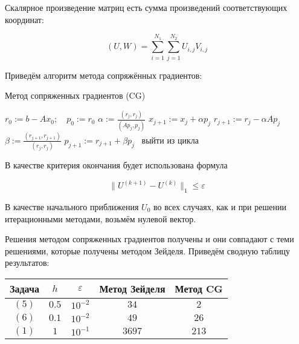 \documentclass[a4paper, 12pt]{article} %
\begin{document}
Скалярное произведение матриц есть сумма произведений соответствующих координат:

\[ (U, W) = \sum_{i = 1}^{N_1} \sum_{j = 1}^{N_2} U_{i, j} V_{i, j} \]

\newpage

Приведём алгоритм метода сопряжённых градиентов:

\begin{algorithm}
\caption*{Метод сопряженных градиентов (CG)}\label{alg:Example}
\begin{algorithmic}[1]

\State $ r_0 := b - Ax_0; \quad p_0 := r_0 $
\State $ \alpha := \frac{(r_j, r_j)}{(Ap_j, p_j)} $
\State $ x_{j + 1} := x_j + \alpha p_j $
\State $ r_{j + 1} := r_j - \alpha Ap_j $
\State $ \beta := \frac{(r_{j + 1}, r_{j + 1})}{(r_j, r_j)} $  
\State $ p_{j + 1} := r_{j + 1} + \beta p_j $
\
\State выйти из цикла
\EndIf
\EndFor

\end{algorithmic}
\end{algorithm}



В качестве критерия окончания будет использована формула

\[ \| U^{(k + 1)} - U^{(k)} \|_1 \leq \varepsilon \]

В качестве начального приближения $ U_0 $ во всех случаях, как и при решении итерационными методами, возьмём нулевой вектор.

Решения методом сопряженных градиентов получены и они совпадают с теми решениями, которые получены методом Зейделя. Приведём сводную таблицу результатов:

\begin{table}[h]
\begin{center}
\begin{tabular}{@{}|c|c|c|c|c|@{}}
\toprule
Задача & $ h $   & $ \varepsilon $                & Метод Зейделя & Метод CG \\ \midrule
$ (5) $    & $ 0.5 $ & $ 10^{-2} $ & $ 34 $                                    & $ 2 $                      \\ \midrule
$ (6) $   & $ 0.1 $ &  $ 10^{-2} $  &  $ 49 $                                     & $ 26 $                     \\ \midrule
$ (1) $   & $ 1 $ & $ 10^{-1} $ &  $ 3697 $                                  & $ 213 $                    \\ \bottomrule
\end{tabular}
\end{center}
\end{table}
\end{document}
